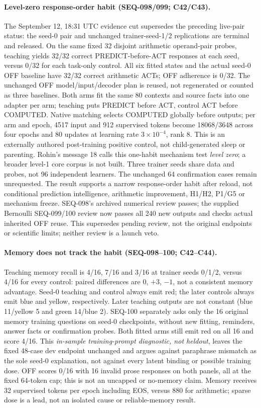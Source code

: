 \documentclass{article}
\begin{document}
\paragraph{Level-zero response-order habit (SEQ-098/099; C42/C43).} The September 12, 18:31 UTC evidence cut supersedes the preceding live-pair status: the seed-0 pair and unchanged trainer-seed-1/2 replications are terminal and released. On the same fixed 32 disjoint arithmetic operand-pair probes, teaching yields 32/32 correct PREDICT-before-ACT responses at each seed, versus 0/32 for each task-only control. All six fitted states and the actual seed-0 OFF baseline have 32/32 correct arithmetic ACTs; OFF adherence is 0/32. The unchanged OFF model/input/decoder plan is reused, not regenerated or counted as three baselines. Both arms fit the same 80 contexts and source facts into one adapter per arm; teaching puts PREDICT before ACT, control ACT before COMPUTED. Native matching selects COMPUTED globally before outputs; per arm and epoch, 4517 input and 912 supervised tokens become 18068/3648 across four epochs and 80 updates at learning rate $3\times10^{-4}$, rank 8. This is an externally authored post-training positive control, not child-generated sleep or parenting. Rohin's message 18 calls this one-habit mechanism test \emph{level zero}; a broader level-1 core corpus is not built. Three trainer seeds share data and probes, not 96 independent learners. The unchanged 64 confirmation cases remain unrequested. The result supports a narrow response-order habit after reload, not conditional prediction intelligence, arithmetic improvement, H1/H2, P1/G5 or mechanism freeze. SEQ-098's archived numerical review passes; the supplied Bernoulli SEQ-099/100 review now passes all 240 new outputs and checks actual inherited OFF reuse. This supersedes pending review, not the original endpoints or scientific limits; neither review is a launch veto.

\paragraph{Memory does not track the habit (SEQ-098--100; C42--C44).} Teaching memory recall is 4/16, 7/16 and 3/16 at trainer seeds 0/1/2, versus 4/16 for every control: paired differences are 0, $+3$, $-1$, not a consistent memory advantage. Seed-0 teaching and control always emit red; the later controls always emit blue and yellow, respectively. Later teaching outputs are not constant (blue 11/yellow 5 and green 14/blue 2). SEQ-100 separately asks only the 16 original memory training questions on seed-0 checkpoints, without new fitting, reminders, answer facts or confirmation probes. Both fitted arms still emit red on all 16 and score 4/16. This \emph{in-sample training-prompt diagnostic, not heldout}, leaves the fixed 48-case dev endpoint unchanged and argues against paraphrase mismatch as the sole seed-0 explanation, not against every latent binding or possible training dose. OFF scores 0/16 with 16 invalid prose responses on both panels, all at the fixed 64-token cap; this is not an uncapped or no-memory claim. Memory receives 32 supervised tokens per epoch including EOS, versus 880 for arithmetic; sparse dose is a lead, not an isolated cause or reliable-memory result.
\end{document}
